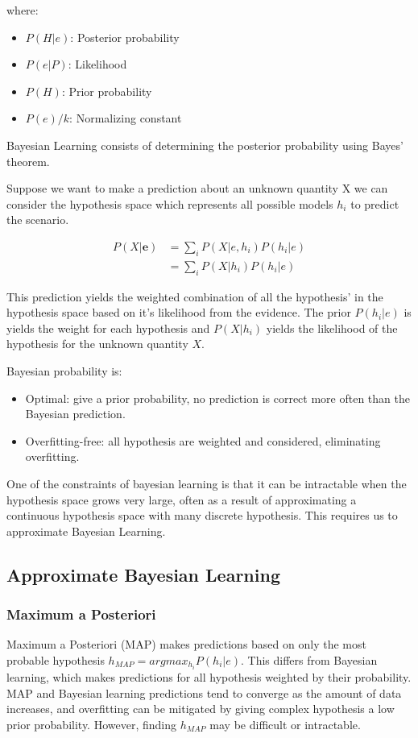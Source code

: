 \documentclass[12pt]{article}
\begin{document}
    where:
    \begin{itemize}
        \item $P(H|e)$: Posterior probability
        \item $P(e|P)$: Likelihood
        \item $P(H)$: Prior probability
        \item $P(e)/k$: Normalizing constant
    \end{itemize}

    Bayesian Learning consists of determining the posterior probability using Bayes' theorem.
    
    Suppose we want to make a prediction about an unknown quantity X we can consider the hypothesis space which represents all possible models $h_i$ to predict the scenario.

    \begin{align}
        P(X|\boldsymbol{e}) &= \sum_i P(X|e, h_i)P(h_i|e) \\
        &= \sum_i P(X|h_i)P(h_i|e)
    \end{align}

    This prediction yields the weighted combination of all the hypothesis' in the hypothesis space based on it's likelihood from the evidence. The prior $P(h_i | e)$ is yields the weight for each hypothesis and $P(X|h_i)$ yields the likelihood
    of the hypothesis for the unknown quantity $X$.

    Bayesian probability is:
    \begin{itemize}
        \item Optimal: give a prior probability, no prediction is correct more often than the Bayesian prediction.
        \item Overfitting-free: all hypothesis are weighted and considered, eliminating overfitting.
    \end{itemize}

    One of the constraints of bayesian learning is that it can be intractable when the hypothesis space grows very large, often as a result of approximating a continuous hypothesis space with many discrete hypothesis. This requires us to approximate 
    Bayesian Learning.

    \subsection{Approximate Bayesian Learning}
    \subsubsection{Maximum a Posteriori}
        Maximum a Posteriori (MAP) makes predictions based on only the most probable hypothesis $h_{MAP} = argmax_{h_i}P(h_i | e)$. This differs from Bayesian learning, which makes predictions for all hypothesis weighted by their probability. 
        MAP and Bayesian learning predictions tend to converge as the amount of data increases, and overfitting can be mitigated by giving complex hypothesis a low prior probability. However, finding $h_{MAP}$ may be difficult or intractable.
\end{document}
